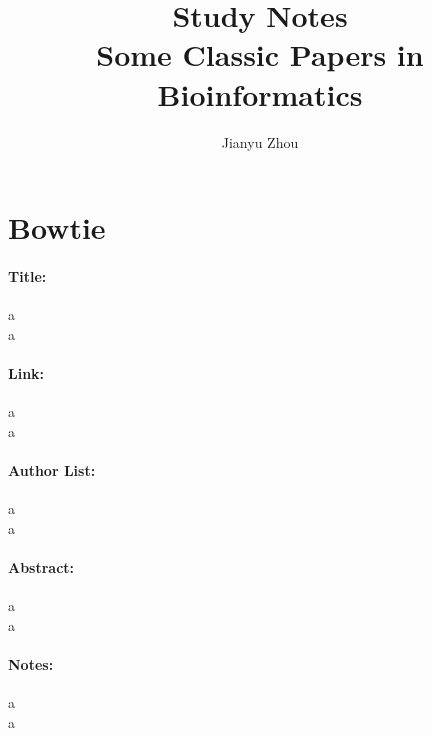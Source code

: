 \documentclass{article}
\title{\textbf{Study Notes} \\ Some Classic Papers in Bioinformatics}
\author{Jianyu Zhou}
\begin{document}
	\maketitle
	\section{Bowtie}
	\paragraph{Title:} a \\ a
	\paragraph{Link:} a \\ a
	\paragraph{Author List:} a \\ a
	\paragraph{Abstract:}  a \\ a
	\paragraph{Notes:}  a\\ a
\end{document}
